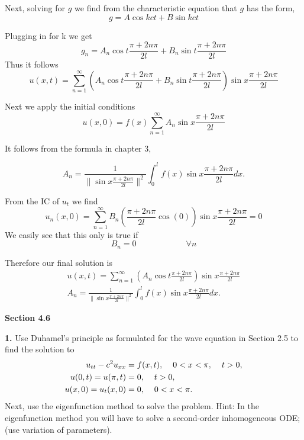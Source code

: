 \documentclass{article}
\begin{document}
Next, solving for \(g\) we find from the characteristic equation that \(g\) has the form, 
\[ g = A\cos kct + B \sin kct \]

Plugging in for k we get
\[
g_n = A_n \cos t\frac{\pi + 2n\pi}{2l} + B_n\sin t\frac{\pi + 2n\pi}{2l} 
\]
Thus it follows 
\[
u(x,t)= \sum_{n=1}^\infty (A_n \cos t\frac{\pi + 2n\pi}{2l} + B_n\sin t\frac{\pi + 2n\pi}{2l} )\sin x\frac{\pi + 2n\pi}{2l} 
\]

Next we apply the initial conditions\[
u(x,0)= f(x) \sum_{n=1}^\infty A_n \sin x\frac{\pi + 2n\pi}{2l} \]

It follows from the formula in chapter 3, 

\[
A_n = \frac 1{\| \sin x\frac{\pi + 2n\pi}{2l}\|^2 } \int_0^l f(x)  \sin x\frac{\pi + 2n\pi}{2l} dx. 
\]

From the IC of \(u_t\) we find
\[
u_n(x,0) =  \sum_{n=1}^\infty B_n(\frac{\pi + 2n\pi}{2l} \cos(0))  \sin x\frac{\pi + 2n\pi}{2l} = 0
\]
We easily see that this only is true if \[
B_n = 0  \hspace{1in} \forall n\]

Therefore our final solution is 
\begin{align*}
u(x,t) = \sum_{n=1}^\infty (A_n \cos t\frac{\pi + 2n\pi}{2l} )\sin x\frac{\pi + 2n\pi}{2l} \\
A_n  = \frac 1{\| \sin x\frac{\pi + 2n\pi}{2l}\|^2 } \int_0^l f(x)  \sin x\frac{\pi + 2n\pi}{2l} dx. 
\end{align*}











\newpage
\textbf{Section 4.6}


\textbf{1. } Use Duhamel's principle as formulated for the wave equation in Section 2.5 to find the solution to 
\begin{align*}
u_{tt} - c^2u_{xx} &= f(x,t), \hspace{4mm} 0<x<\pi,\hspace{4mm}t>0,\\
u(0,t) = u(\pi,t)&=0,\hspace{4mm}t>0,\\
u(x,0) = u_t(x,0) &=0, \hspace{4mm} 0<x<\pi.
\end{align*}
Next, use the eigenfunction method to solve the problem. Hint: In the eigenfunction method you will have to solve a second-order inhomogeneous ODE; (use variation of parameters). 
\end{document}
